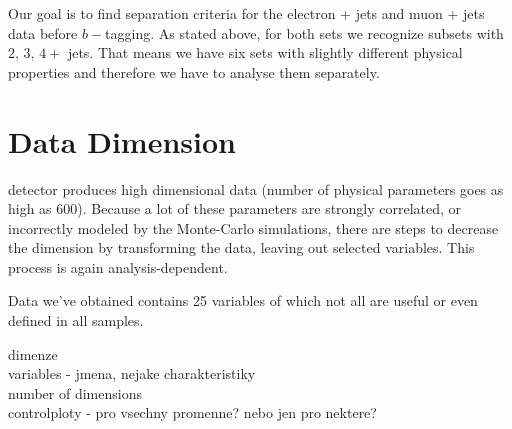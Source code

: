 Our goal is to find separation criteria for the electron + jets and muon + jets data before $b-$tagging. As stated above, for both sets we recognize subsets with $2, \,3,\, 4+$ jets. That means we have six sets with slightly different physical properties and therefore we have to analyse them separately. 

\section{Data Dimension}
\dzero detector  produces high dimensional data (number of physical parameters  goes as high as $600$). Because a lot of these parameters are strongly correlated, or incorrectly modeled by the Monte-Carlo simulations, there are steps to decrease the dimension by transforming the data, leaving out selected variables. This process is again analysis-dependent.

Data we've obtained contains 25 variables of which not all are useful or even defined in all samples. 

dimenze \\
variables - jmena, nejake charakteristiky \\
number of dimensions \\
controlploty - pro vsechny promenne? nebo jen pro nektere?\\


